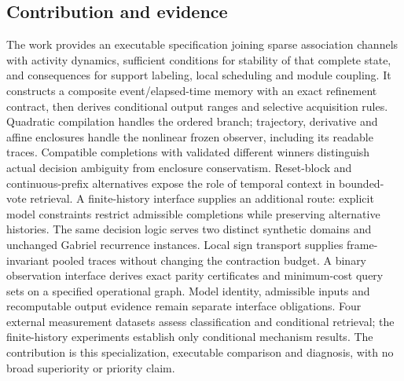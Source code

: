 \documentclass[11pt,a4paper]{article}
\theoremstyle{definition}\newtheorem{definition}[theorem]{Definition}
\begin{document}
\subsection{Contribution and evidence}
The work provides an executable specification joining sparse association channels with activity dynamics, sufficient conditions for stability of that complete state, and consequences for support labeling, local scheduling and module coupling. It constructs a composite event/elapsed-time memory with an exact refinement contract, then derives conditional output ranges and selective acquisition rules. Quadratic compilation handles the ordered branch; trajectory, derivative and affine enclosures handle the nonlinear frozen observer, including its readable traces. Compatible completions with validated different winners distinguish actual decision ambiguity from enclosure conservatism. Reset-block and continuous-prefix alternatives expose the role of temporal context in bounded-vote retrieval. A finite-history interface supplies an additional route: explicit model constraints restrict admissible completions while preserving alternative histories. The same decision logic serves two distinct synthetic domains and unchanged Gabriel recurrence instances. Local sign transport supplies frame-invariant pooled traces without changing the contraction budget. A binary observation interface derives exact parity certificates and minimum-cost query sets on a specified operational graph. Model identity, admissible inputs and recomputable output evidence remain separate interface obligations. Four external measurement datasets assess classification and conditional retrieval; the finite-history experiments establish only conditional mechanism results. The contribution is this specialization, executable comparison and diagnosis, with no broad superiority or priority claim.
\end{document}
